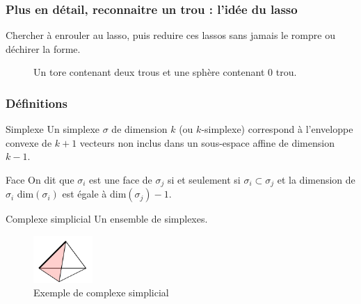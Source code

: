 \documentclass{beamer}
\begin{document}
\begin{frame}
    \frametitle{Plus en détail, reconnaitre un trou : l'idée du lasso}
    Chercher à enrouler au lasso, puis reduire ces lassos sans jamais le rompre ou déchirer la forme.  
    \begin{figure}
        \centering
        \caption{Un tore contenant deux trous et une sphère contenant 0 trou.}
    \end{figure}
\end{frame}

\begin{frame}
    \frametitle{Définitions}
    \begin{block}{Simplexe}
        Un simplexe $\sigma$ de dimension $k$ (ou $k$-simplexe) correspond à l'enveloppe convexe de $k+1$ vecteurs non inclus dans un sous-espace affine de dimension $k-1$.
    \end{block}

    \begin{block}{Face}
        On dit que $\sigma_i$ est une face de $\sigma_j$ si et seulement si $\sigma_i \subset \sigma_j$ et la dimension de $\sigma_i$ dim$(\sigma_i)$ est égale à dim$(\sigma_j) - 1$.
    \end{block}

    \begin{block}{Complexe simplicial}
        Un ensemble de simplexes.
    \end{block}

    \begin{figure}
        \includegraphics[width=0.2\textwidth]{../images/SimpFaceCompl.png}
        \centering
        \caption{Exemple de complexe simplicial}
    \end{figure}
    
\end{frame}
\end{document}
